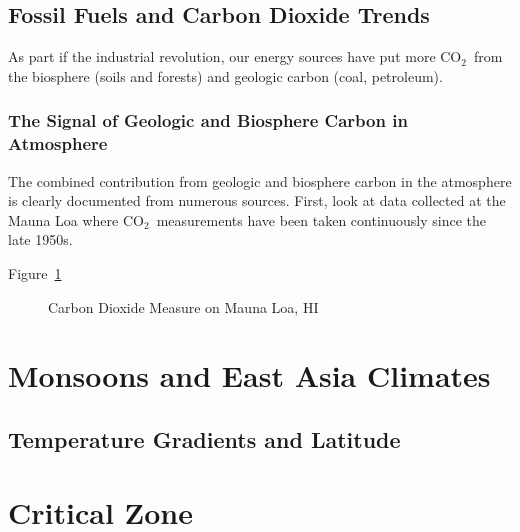 \documentclass{book}\usepackage{knitr}
\newcommand{\carbondioxide}{CO$_2$~}
\begin{document}
\section{Fossil Fuels and Carbon Dioxide Trends}\label{sec:fossilfuels}

As part if the industrial revolution, our energy sources have put more \carbondioxide from the biosphere (soils and forests) and geologic carbon (coal, petroleum). 

\subsection{The Signal of Geologic and Biosphere Carbon in Atmosphere}

The combined contribution from geologic and biosphere carbon in the atmosphere is clearly documented from numerous sources. First, look at data collected at the Mauna Loa where \carbondioxide measurements have been taken continuously since the late 1950s. 

Figure~\ref{fig:maunaloa2}

\begin{figure}
\begin{knitrout}
\color{fgcolor}\begin{kframe}


{\ttfamily\noindent\bfseries\color{errorcolor}{\#\# Error in ggplot(train.data, aes(decimal.date, average)): object 'train.data' not found}}\end{kframe}
\end{knitrout}
\caption{Carbon Dioxide Measure on Mauna Loa, HI}
\label{fig:maunaloa2}
\end{figure}






\chapter{Monsoons and East Asia Climates}

\section{Temperature Gradients and Latitude}





\chapter{Critical Zone}\label{ch:critical-zone}
\end{document}

